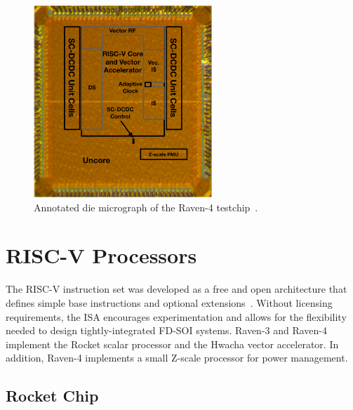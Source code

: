 \documentclass[graybox]{svmult}
\begin{document}
\begin{figure}
  \centering
  \includegraphics[width=0.6\textwidth]{6-raven4-diephoto}
  \caption{Annotated die micrograph of the Raven-4 testchip~\cite{Keller2016}.}
  \label{fig:6-raven4-diephoto}
\end{figure}



\section{RISC-V Processors}

The RISC-V instruction set was developed as a free and open architecture that defines simple base instructions and optional extensions~\cite{RISCV}.
Without licensing requirements, the ISA encourages experimentation and allows for the flexibility needed to design tightly-integrated FD-SOI systems.
Raven-3 and Raven-4 implement the Rocket scalar processor and the Hwacha vector accelerator.
In addition, Raven-4 implements a small Z-scale processor for power management.

\subsection{Rocket Chip}
\end{document}
